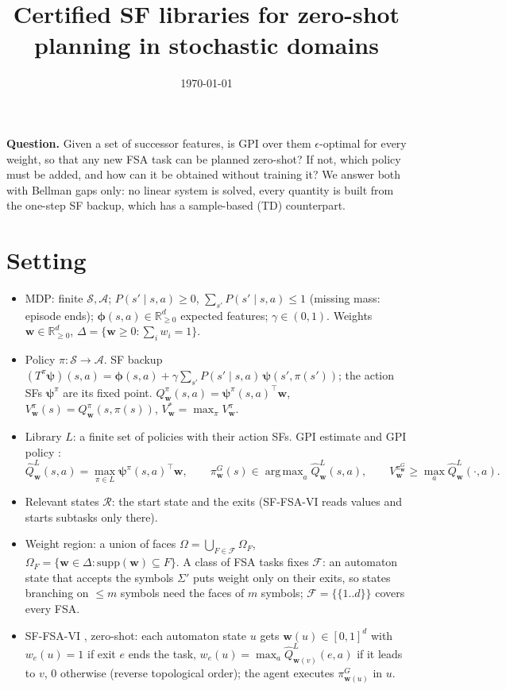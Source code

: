 \documentclass[11pt]{article}
\title{Certified SF libraries for zero-shot planning in stochastic domains}
\author{}
\date{\today}
\newcommand{\vphi}{\bm{\phi}}
\newcommand{\vpsi}{\bm{\psi}}
\newcommand{\w}{\mathbf{w}}
\newcommand{\cS}{\mathcal S}
\newcommand{\cA}{\mathcal A}
\newcommand{\cR}{\mathcal R}
\newcommand{\R}{\mathbb R}
\DeclareMathOperator*{\argmax}{arg\,max}
\theoremstyle{definition}
\begin{document}
\maketitle

\noindent\textbf{Question.} Given a set of successor features, is GPI over them $\epsilon$-optimal for every
weight, so that any new FSA task can be planned zero-shot? If not, which policy must be added, and how can it be
obtained without training it? We answer both with Bellman gaps only: no linear system is solved, every quantity
is built from the one-step SF backup, which has a sample-based (TD) counterpart.

\section{Setting}

\begin{itemize}
\item MDP: finite $\cS,\cA$; $P(s'\mid s,a)\ge0$, $\sum_{s'}P(s'\mid s,a)\le1$ (missing mass: episode ends);
$\vphi(s,a)\in\R^d_{\ge0}$ expected features; $\gamma\in(0,1)$. Weights $\w\in\R^d_{\ge0}$,
$\Delta=\{\w\ge0:\sum_iw_i=1\}$.
\item Policy $\pi:\cS\to\cA$. SF backup
$(T^\pi\vpsi)(s,a)=\vphi(s,a)+\gamma\sum_{s'}P(s'\mid s,a)\,\vpsi(s',\pi(s'))$; the action SFs $\vpsi^\pi$ are its
fixed point. $Q^\pi_\w(s,a)=\vpsi^\pi(s,a)^\top\w$, $V^\pi_\w(s)=Q^\pi_\w(s,\pi(s))$, $V^*_\w=\max_\pi V^\pi_\w$.
\item Library $L$: a finite set of policies with their action SFs. GPI estimate and GPI policy \cite{barreto17}:
\[
\hat Q^L_\w(s,a)=\max_{\pi\in L}\vpsi^\pi(s,a)^\top\w,\qquad \pi^G_\w(s)\in\argmax_a\hat Q^L_\w(s,a),\qquad
V^{\pi^G_\w}_\w\ge\max_a\hat Q^L_\w(\cdot,a).
\]
\item Relevant states $\cR$: the start state and the exits (SF-FSA-VI reads values and starts subtasks only there).
\item Weight region: a union of faces $\Omega=\bigcup_{F\in\mathcal F}\Omega_F$,
$\Omega_F=\{\w\in\Delta:\mathrm{supp}(\w)\subseteq F\}$. A class of FSA tasks fixes $\mathcal F$: an automaton state that
accepts the symbols $\Sigma'$ puts weight only on their exits, so states branching on $\le m$ symbols need the faces of
$m$ symbols; $\mathcal F=\{\{1..d\}\}$ covers every FSA.
\item SF-FSA-VI \cite{kuric}, zero-shot: each automaton state $u$ gets $\w(u)\in[0,1]^d$ with
$w_e(u)=1$ if exit $e$ ends the task, $w_e(u)=\max_a\hat Q^L_{\w(v)}(e,a)$ if it leads to $v$, $0$ otherwise
(reverse topological order); the agent executes $\pi^G_{\w(u)}$ in $u$.
\end{itemize}
\end{document}
